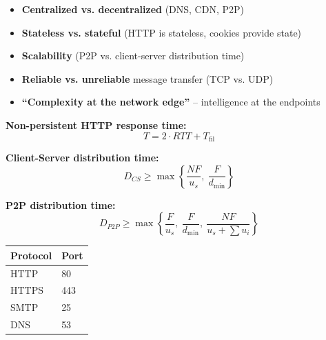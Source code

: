 \begin{keybox}
\begin{itemize}[noitemsep]
    \item \textbf{Centralized vs. decentralized} (DNS, CDN, P2P)
    \item \textbf{Stateless vs. stateful} (HTTP is stateless, cookies provide state)
    \item \textbf{Scalability} (P2P vs. client-server distribution time)
    \item \textbf{Reliable vs. unreliable} message transfer (TCP vs. UDP)
    \item \textbf{``Complexity at the network edge''} -- intelligence at the endpoints
\end{itemize}
\end{keybox}

\begin{formulabox}
\textbf{Non-persistent HTTP response time:}
$$T = 2 \cdot RTT + T_{\text{fil}}$$

\textbf{Client-Server distribution time:}
$$D_{CS} \geq \max\left\{\frac{NF}{u_s},\ \frac{F}{d_{\min}}\right\}$$

\textbf{P2P distribution time:}
$$D_{P2P} \geq \max\left\{\frac{F}{u_s},\ \frac{F}{d_{\min}},\ \frac{NF}{u_s + \sum u_i}\right\}$$
\end{formulabox}

\begin{keybox}
\begin{tabular}{ll}
\toprule
\textbf{Protocol} & \textbf{Port} \\
\midrule
HTTP & 80 \\
HTTPS & 443 \\
SMTP & 25 \\
DNS & 53 \\
\bottomrule
\end{tabular}
\end{keybox}
